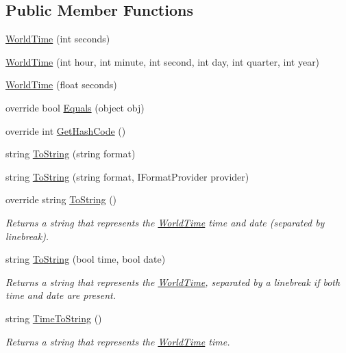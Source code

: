 \subsection*{Public Member Functions}
\begin{DoxyCompactItemize}
\item 
\hyperlink{struct_world_time_aeab5b857de135723065af7a79f4cde18}{World\+Time} (int seconds)
\item 
\hyperlink{struct_world_time_a5eb3e286eab82748acbe202a9b8054db}{World\+Time} (int hour, int minute, int second, int day, int quarter, int year)
\item 
\hyperlink{struct_world_time_afcb648681751290a686d4459ece7a151}{World\+Time} (float seconds)
\item 
override bool \hyperlink{struct_world_time_afa782ba4bacde4ebb85659550d02385c}{Equals} (object obj)
\item 
override int \hyperlink{struct_world_time_a50612e81737fa437c23138f70a7b0bc8}{Get\+Hash\+Code} ()
\item 
string \hyperlink{struct_world_time_ae1539be853ff4914487e4f8aa8f74fd2}{To\+String} (string format)
\item 
string \hyperlink{struct_world_time_a5ea34c4e7f7d313b18a0a4d919c717df}{To\+String} (string format, I\+Format\+Provider provider)
\item 
override string \hyperlink{struct_world_time_a01674520b36112e2efb356198266dd40}{To\+String} ()
\begin{DoxyCompactList}\small\item\em Returns a string that represents the \hyperlink{struct_world_time}{World\+Time} time and date (separated by linebreak). \end{DoxyCompactList}\item 
string \hyperlink{struct_world_time_aa38d53e5d04fd8a24ef379f215bea622}{To\+String} (bool time, bool date)
\begin{DoxyCompactList}\small\item\em Returns a string that represents the \hyperlink{struct_world_time}{World\+Time}, separated by a linebreak if both time and date are present. \end{DoxyCompactList}\item 
string \hyperlink{struct_world_time_aa2faf2c350acee94faf8a8e88c586ea0}{Time\+To\+String} ()
\begin{DoxyCompactList}\small\item\em Returns a string that represents the \hyperlink{struct_world_time}{World\+Time} time. \end{DoxyCompactList}\item 

\end{DoxyCompactItemize}
